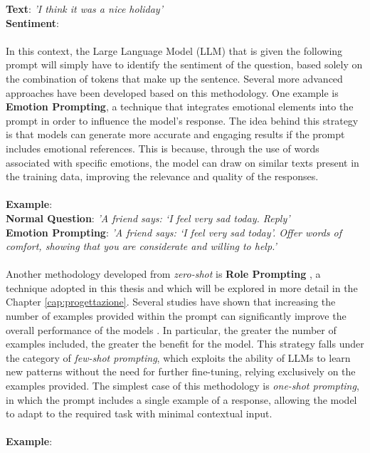 \textbf{Text}: \textit{'I think it was a nice holiday'}\\
\textbf{Sentiment}:\\
\\
In this context, the Large Language Model (LLM) that is given the following prompt will simply have to identify the sentiment of the question, based solely on the combination of tokens that make up the sentence. Several more advanced approaches have been developed based on this methodology.
One example is \textbf{Emotion Prompting}\cite{Emotionprompt}, a technique that integrates emotional elements into the prompt in order to influence the model's response. The idea behind this strategy is that models can generate more accurate and engaging results if the prompt includes emotional references. This is because, through the use of words associated with specific emotions, the model can draw on similar texts present in the training data, improving the relevance and quality of the responses.\\
\\
\textbf{Example}: \\
\textbf{Normal Question}: \textit{'A friend says: ‘I feel very sad today. Reply'}\\
\textbf{Emotion Prompting}: \textit{'A friend says: ‘I feel very sad today’. Offer words of comfort, showing that you are considerate and willing to help.'}\\
\\
Another methodology developed from \textit{zero-shot} is \textbf{Role Prompting} \cite{Role}, a technique adopted in this thesis and which will be explored in more detail in the Chapter \ref{cap:progettazione}.
Several studies have shown that increasing the number of examples provided within the prompt can significantly improve the overall performance of the models \cite{schulhoff2025promptreportsystematicsurvey}.
In particular, the greater the number of examples included, the greater the benefit for the model. This strategy falls under the category of \textit{few-shot prompting}, which exploits the ability of LLMs to learn new patterns without the need for further fine-tuning, relying exclusively on the examples provided.
The simplest case of this methodology is \textit{one-shot prompting}, in which the prompt includes a single example of a response, allowing the model to adapt to the required task with minimal contextual input.\\
\\
\textbf{Example}: \\
